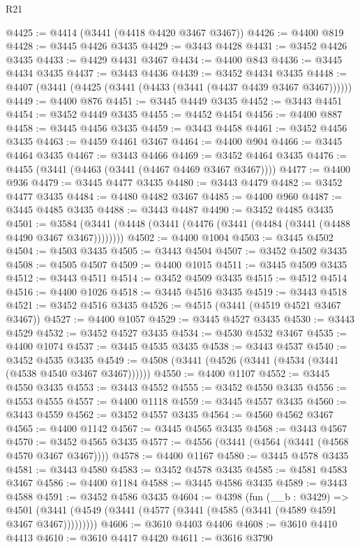 \begin{lexlean}{R21}
\begin{coremodule}
@4425 := @4414 (@3441 (@4418 @4420 @3467 @3467))
@4426 := @4400 @819
@4428 := @3445 @4426 @3435
@4429 := @3443 @4428
@4431 := @3452 @4426 @3435
@4433 := @4429 @4431 @3467
@4434 := @4400 @843
@4436 := @3445 @4434 @3435
@4437 := @3443 @4436
@4439 := @3452 @4434 @3435
@4448 := @4407 (@3441 (@4425 (@3441 (@4433 (@3441 (@4437 @4439 @3467 @3467))))))
@4449 := @4400 @876
@4451 := @3445 @4449 @3435
@4452 := @3443 @4451
@4454 := @3452 @4449 @3435
@4455 := @4452 @4454
@4456 := @4400 @887
@4458 := @3445 @4456 @3435
@4459 := @3443 @4458
@4461 := @3452 @4456 @3435
@4463 := @4459 @4461 @3467
@4464 := @4400 @904
@4466 := @3445 @4464 @3435
@4467 := @3443 @4466
@4469 := @3452 @4464 @3435
@4476 := @4455 (@3441 (@4463 (@3441 (@4467 @4469 @3467 @3467))))
@4477 := @4400 @936
@4479 := @3445 @4477 @3435
@4480 := @3443 @4479
@4482 := @3452 @4477 @3435
@4484 := @4480 @4482 @3467
@4485 := @4400 @960
@4487 := @3445 @4485 @3435
@4488 := @3443 @4487
@4490 := @3452 @4485 @3435
@4501 := @3584 (@3441 (@4448 (@3441 (@4476 (@3441 (@4484 (@3441 (@4488 @4490 @3467 @3467))))))))
@4502 := @4400 @1004
@4503 := @3445 @4502
@4504 := @4503 @3435
@4505 := @3443 @4504
@4507 := @3452 @4502 @3435
@4508 := @4505 @4507
@4509 := @4400 @1015
@4511 := @3445 @4509 @3435
@4512 := @3443 @4511
@4514 := @3452 @4509 @3435
@4515 := @4512 @4514
@4516 := @4400 @1026
@4518 := @3445 @4516 @3435
@4519 := @3443 @4518
@4521 := @3452 @4516 @3435
@4526 := @4515 (@3441 (@4519 @4521 @3467 @3467))
@4527 := @4400 @1057
@4529 := @3445 @4527 @3435
@4530 := @3443 @4529
@4532 := @3452 @4527 @3435
@4534 := @4530 @4532 @3467
@4535 := @4400 @1074
@4537 := @3445 @4535 @3435
@4538 := @3443 @4537
@4540 := @3452 @4535 @3435
@4549 := @4508 (@3441 (@4526 (@3441 (@4534 (@3441 (@4538 @4540 @3467 @3467))))))
@4550 := @4400 @1107
@4552 := @3445 @4550 @3435
@4553 := @3443 @4552
@4555 := @3452 @4550 @3435
@4556 := @4553 @4555
@4557 := @4400 @1118
@4559 := @3445 @4557 @3435
@4560 := @3443 @4559
@4562 := @3452 @4557 @3435
@4564 := @4560 @4562 @3467
@4565 := @4400 @1142
@4567 := @3445 @4565 @3435
@4568 := @3443 @4567
@4570 := @3452 @4565 @3435
@4577 := @4556 (@3441 (@4564 (@3441 (@4568 @4570 @3467 @3467))))
@4578 := @4400 @1167
@4580 := @3445 @4578 @3435
@4581 := @3443 @4580
@4583 := @3452 @4578 @3435
@4585 := @4581 @4583 @3467
@4586 := @4400 @1184
@4588 := @3445 @4586 @3435
@4589 := @3443 @4588
@4591 := @3452 @4586 @3435
@4604 := @4398
    (fun (__b : @3429) =>
    @4501 (@3441 (@4549 (@3441 (@4577 (@3441 (@4585 (@3441 (@4589 @4591 @3467 @3467)))))))))
@4606 := @3610 @4403 @4406
@4608 := @3610 @4410 @4413
@4610 := @3610 @4417 @4420
@4611 := @3616 @3790

\end{coremodule}
\end{lexlean}
